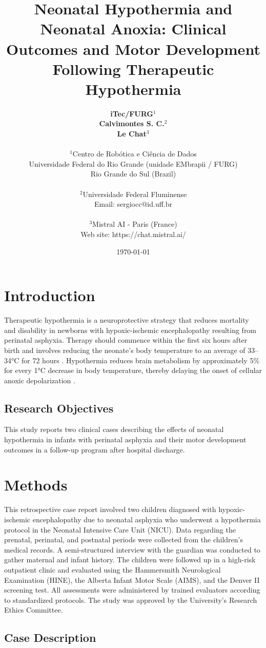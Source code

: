 \documentclass[11pt,a4paper]{article}
\title{\textbf{Neonatal Hypothermia and Neonatal Anoxia: Clinical Outcomes and Motor Development Following Therapeutic Hypothermia}}
\author{
	\textbf{iTec/FURG}$^{1}$ \\
	\textbf{Calvimontes S. C.}$^{2}$ \\
	\textbf{Le Chat}$^{3}$ \\
	\\
	\small $^{1}$Centro de Robótica e Ciência de Dados \\
	\small Universidade Federal do Rio Grande (unidade EMbrapii / FURG) \\
	\small Rio Grande do Sul (Brazil) \\
	\\
	\small $^{2}$Universidade Federal Fluminense \\
	\small Email: sergiocc@id.uff.br \\
	\\
	\small $^{3}$Mistral AI - Paris (France) \\
	\small Web site: https://chat.mistral.ai/
}
\date{\today}
\begin{document}
	
	\maketitle
	
	\newpage
	
	\section{Introduction}
	Therapeutic hypothermia is a neuroprotective strategy that reduces mortality and disability in newborns with hypoxic-ischemic encephalopathy resulting from perinatal asphyxia. Therapy should commence within the first six hours after birth and involves reducing the neonate’s body temperature to an average of 33–34°C for 72 hours \cite{Azzopardi2014,Thayyil2021,Abate2021}. Hypothermia reduces brain metabolism by approximately 5\% for every 1°C decrease in body temperature, thereby delaying the onset of cellular anoxic depolarization \cite{Silveira2015}.
		
	\subsection{Research Objectives}
	This study reports two clinical cases describing the effects of neonatal hypothermia in infants with perinatal asphyxia and their motor development outcomes in a follow-up program after hospital discharge.
	
	\section{Methods}
	This retrospective case report involved two children diagnosed with hypoxic-ischemic encephalopathy due to neonatal asphyxia who underwent a hypothermia protocol in the Neonatal Intensive Care Unit (NICU). Data regarding the prenatal, perinatal, and postnatal periods were collected from the children’s medical records. A semi-structured interview with the guardian was conducted to gather maternal and infant history. The children were followed up in a high-risk outpatient clinic and evaluated using the Hammersmith Neurological Examination (HINE), the Alberta Infant Motor Scale (AIMS), and the Denver II screening test. All assessments were administered by trained evaluators according to standardized protocols. The study was approved by the University’s Research Ethics Committee.
	
	\subsection{Case Description}
\end{document}
